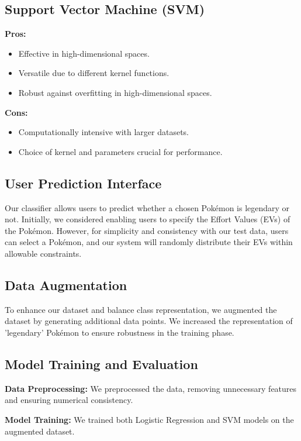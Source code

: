 \documentclass[conference]{IEEEtran}
\begin{document}
\subsection{Support Vector Machine (SVM)}
\textbf{Pros:}
\begin{itemize}
    \item Effective in high-dimensional spaces.
    \item Versatile due to different kernel functions.
    \item Robust against overfitting in high-dimensional spaces.
\end{itemize}

\textbf{Cons:}
\begin{itemize}
    \item Computationally intensive with larger datasets.
    \item Choice of kernel and parameters crucial for performance.
\end{itemize}

\subsection{User Prediction Interface}

Our classifier allows users to predict whether a chosen Pokémon is legendary or not. Initially, we considered enabling users to specify the Effort Values (EVs) of the Pokémon. However, for simplicity and consistency with our test data, users can select a Pokémon, and our system will randomly distribute their EVs within allowable constraints.

\subsection{Data Augmentation}

To enhance our dataset and balance class representation, we augmented the dataset by generating additional data points. We increased the representation of 'legendary' Pokémon to ensure robustness in the training phase.

\subsection{Model Training and Evaluation}

\textbf{Data Preprocessing:} We preprocessed the data, removing unnecessary features and ensuring numerical consistency.

\textbf{Model Training:} We trained both Logistic Regression and SVM models on the augmented dataset.
\end{document}
